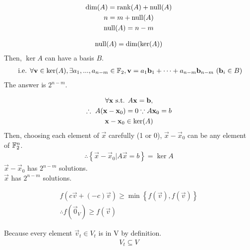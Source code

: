 \documentclass{mathtoolkit}
\begin{document}
\maketitle

\begin{p}
  \item
    \begin{subp}
      \item
        \begin{gather*}
          \mathrm{dim}(A) = \mathrm{rank}(A) + \mathrm{null}(A) \\
          n = m + \mathrm{null}(A) \\
          \mathrm{null}(A) = n - m
        \end{gather*}
      \item
        \begin{gather*}
          \mathrm{null}(A) = \mathrm{dim}(\mathrm{ker}(A))
        \end{gather*}
        Then, $\ker{A}$ can have a basis $B$.
        \begin{gather*}
          \text{i.e.} \forall \vec{v} \in \ker{A},
          \exists a_1, ..., a_{n-m} \in \field{F}_2,
          \vec{v} = a_1 \vec{b}_1 + \dots + a_{n-m} \vec{b}_{n-m}\ (\vec{b}_i \in B)
        \end{gather*}
        \therefore The answer is $2^{n-m}$.
      \item
        \begin{gather*}
          \forall \vec{x} \st A \vec{x} = \vec{b}, \\
          \therefore A (\vec{x} - \vec{x}_0) = 0 \because A \vec{x}_0 = b \\
          \vec{x} - \vec{x}_0 \in \ker{A}
        \end{gather*}
        Then, choosing each element of $\vec{x}$ carefully (1 or 0),
        $\vec{x} - \vec{x}_0$ can be any element of $\mathbb{F}^n_2$.
        \begin{gather*}
          \therefore \left\{ \vec{x} - \vec{x}_0 | A \vec{x} = b \right\} = \ker{A}
        \end{gather*}
        \therefore $\vec{x} - \vec{x}_0$ has $2^{n-m}$ solutions. \\
        \therefore $\vec{x}$ has $2^{n-m}$ solutions. \\
    \end{subp}

  \item
    \begin{subp}
      \item
        \begin{gather*}
          f(c \vec{v} + (-c) \vec{v}) \ge \min \left\{ f(\vec{v}), f(\vec{v}) \right\} \\
          \therefore f(\vec{0}_V) \ge f(\vec{v})
        \end{gather*}
      \item
        Because every element $\vec{v}_t \in V_t$ is in V by definition.
        \begin{gather*}
          V_t \subseteq V
        \end{gather*}
    \end{subp}


\end{p}
\end{document}
